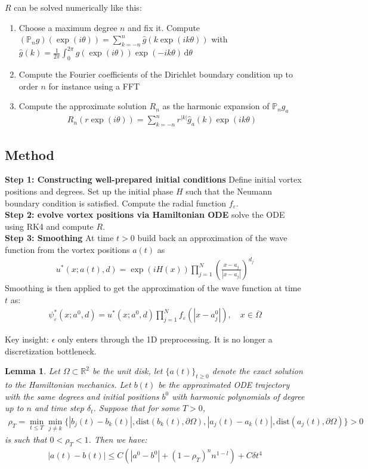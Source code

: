 \documentclass[12pt, a4paper]{article}
\theoremstyle{plain}
\newtheorem{lemma}[theorem]{Lemma}
\theoremstyle{definition}
\newcommand{\R}{\mathbb{R}}
\newcommand{\psieps}{\psi_\varepsilon}
\newcommand{\dd}{\,\mathrm{d}}
\begin{document}
$R$ can be solved numerically like this:
\begin{enumerate}
\item Choose a maximum degree $n$ and fix it.
Compute $(\mathbb{P}_n g)(\exp (i\theta)) = \sum^n_{k=-n} \hat g (k \exp (i k \theta))$
with $\hat g (k) = \frac{1}{2\pi} \int^{2\pi}_0 g(\exp (i\theta)) \exp (- i k \theta) \dd \theta$
\item Compute the Fourier coefficients of the Dirichlet boundary condition up to order $n$ for instance using a FFT
\item Compute the approximate solution $R_n$ as the harmonic expansion of $\mathbb{P}_n g_a$
\begin{align}
    R_n (r \exp (i \theta)) = \sum^n_{k=-n} r^{|k|} \hat g_a (k) \exp (i k \theta)
\end{align}
\end{enumerate}

\subsection{Method}

\textbf{Step 1: Constructing well-prepared initial conditions}
Define initial vortex positions and degrees. Set up the initial phase $H$ such that the Neumann boundary condition is satisfied.
Compute the radial function $f_\varepsilon$.
\\
\textbf{Step 2: evolve vortex positions via Hamiltonian ODE}
solve the ODE using RK4 and compute $R$.
\\
\textbf{Step 3: Smoothing}
At time $t>0$ build back an approximation of the wave function from the vortex positions $a(t)$ as
\begin{align}
    u^* (x; a(t), d) = \exp (i H(x)) \prod^N_{j=1} (\frac{x-a_j}{|x-a_j|})^{d_j}
\end{align}
Smoothing is then applied to get the approximation of the wave function at time $t$ as:
\begin{align}
    \psieps^* (x; a^0, d) = u^* (x; a^0, d) \prod^N_{j=1} f_\varepsilon (|x- a^0_j|), \quad x \in \overline \Omega
\end{align}

Key insight: $\epsilon$ only enters through the 1D preprocessing.
It is no longer a discretization bottleneck.

\begin{lemma}
  Let $\Omega \subset \R^2$ be the unit disk, let $\{a(t)\}_{t\geq 0}$ denote the exact solution to the Hamiltonian mechanics.
  Let $b(t)$ be the approximated ODE trajectory with the same degrees and initial positions $b^0$ with harmonic polynomials of degree up to $n$
  and time step $\delta_t$. Suppose that for some $T>0$,
  \begin{align}
  \rho_T = \min_{t\leq T} \min_{j\neq k} \{ |b_j (t) - b_k  (t)|, \text{dist} (b_k(t) , \partial \Omega), |a_j (t) - a_k  (t)|, \text{dist} (a_j(t) , \partial \Omega)\}>0
  \end{align}
  is such that $0 < \rho_T < 1$. Then we have:
  \begin{align}
    |a(t) - b(t)| \leq C (|a^0 -b^0| + (1- \rho_T)^n n^{1-l}) + C \delta t^4
  \end{align}
\end{lemma}

\nocite{*}
\printbibliography
\end{document}

